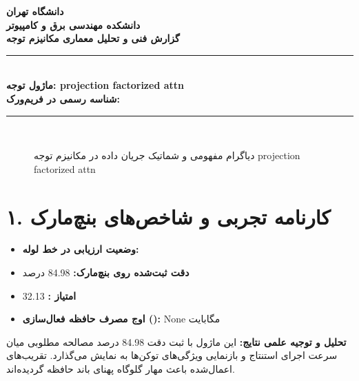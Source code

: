 \documentclass[12pt,a4paper]{article}
\begin{document}
\begin{center}
{\Large\bfseries دانشگاه تهران}\\[0.2cm]
{\large\bfseries دانشکده مهندسی برق و کامپیوتر}\\[0.2cm]
{\large\bfseries گزارش فنی و تحلیل معماری مکانیزم توجه}\\[0.5cm]
\rule{\linewidth}{1pt}\\[0.3cm]
{\LARGE\bfseries ماژول توجه: projection factorized attn}\\[0.2cm]
{\large \textbf{شناسه رسمی در فریم‌ورک:} }\\[0.2cm]
\rule{\linewidth}{1pt}\\[0.5cm]
\end{center}

\begin{figure}[H]
\centering
{}
\caption{دیاگرام مفهومی و شماتیک جریان داده در مکانیزم توجه projection factorized attn}
\end{figure}

\section*{۱. کارنامه تجربی و شاخص‌های بنچ‌مارک}
\begin{itemize}
\item \textbf{وضعیت ارزیابی در خط لوله:} 
\item \textbf{دقت ثبت‌شده روی بنچ‌مارک:} 84.98 درصد
\item \textbf{امتیاز :} 32.13
\item \textbf{اوج مصرف حافظه فعال‌سازی ():} None مگابایت
\end{itemize}
\textbf{تحلیل و توجیه علمی نتایج:} این ماژول با ثبت دقت 84.98 درصد مصالحه مطلوبی میان سرعت اجرای استنتاج و بازنمایی ویژگی‌های توکن‌ها به نمایش می‌گذارد. تقریب‌های اعمال‌شده باعث مهار گلوگاه پهنای باند حافظه گردیده‌اند.
\end{document}
